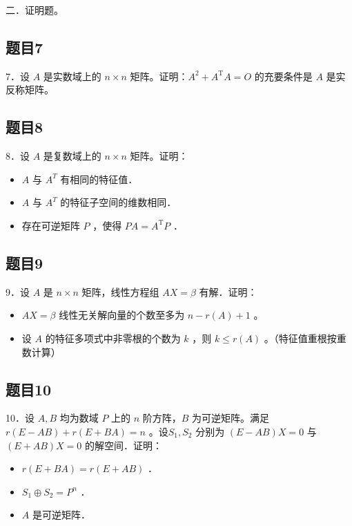 \documentclass{article}
\begin{document}
二．证明题。\\

\subsection{题目7}
7．设 \(A\) 是实数域上的 \(n \times n\) 矩阵。证明：\(A^{2}+A^{\mathrm{T}} A=O\) 的充要条件是 \(A\) 是实反称矩阵。

\subsection{题目8}
8．设 \(A\) 是复数域上的 \(n \times n\) 矩阵。证明：

\begin{itemize}
  \item[（1）] \(A\) 与 \(A^{T}\) 有相同的特征值．
  \item[（2）] \(A\) 与 \(A^{T}\) 的特征子空间的维数相同．
  \item[（3）] 存在可逆矩阵 \(P\) ，使得 \(P A=A^{\mathrm{T}} P\) ．
\end{itemize}

\subsection{题目9}
9．设 \(A\) 是 \(n \times n\) 矩阵，线性方程组 \(A X=\beta\) 有解．证明：

\begin{itemize}
  \item[（1）] \(A X=\beta\) 线性无关解向量的个数至多为 \(n-r(A)+1\) 。
  \item[（2）] 设 \(A\) 的特征多项式中非零根的个数为 \(k\) ，则 \(k \leq r(A)\) 。（特征值重根按重数计算）
\end{itemize}

\subsection{题目10}
10．设 \(A, B\) 均为数域 \(P\) 上的 \(n\) 阶方阵，\(B\) 为可逆矩阵。满足 \(r(E-A B)+r(E+B A)=n\) 。设\(S_{1}, S_{2}\) 分别为 \((E-A B) X=0\) 与 \((E+A B) X=0\) 的解空间．证明：

\begin{itemize}
  \item[（1）] \(r(E+B A)=r(E+A B)\) ．
  \item[（2）] \(S_{1} \oplus S_{2}=P^{n}\) ．
  \item[（3）] \(A\) 是可逆矩阵．
\end{itemize}
\end{document}
